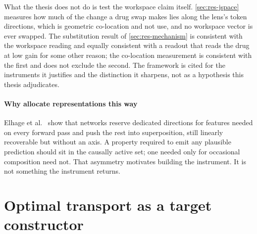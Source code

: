 %
\begin{scopelimit}
What the thesis does not do is test the workspace claim itself.
\cref{sec:res-jspace} measures how much of the change a drug swap makes lies
along the lens's token directions, which is geometric co-location and not use,
and no workspace vector is ever swapped. The substitution result
of \cref{sec:res-mechanism} is consistent with the workspace reading and
equally consistent with a readout that reads the drug at low gain for some
other reason; the co-location measurement is consistent with the first and
does not exclude the second. The framework is cited for the instruments it
justifies and the distinction it sharpens, not as a hypothesis this thesis
adjudicates.
\end{scopelimit}

\paragraph{Why allocate representations this way} Elhage et
al.~\cite{superposition} show that networks reserve dedicated directions for
features needed on every forward pass and push the rest into superposition, still
linearly recoverable but without an axis. A property required to emit any
plausible prediction should sit in the causally active set; one needed only for
occasional composition need not. That asymmetry motivates building the
instrument. It is not something the instrument returns.

\section{Optimal transport as a target constructor}
\label{sec:lit-ot}
\framedecl{-}


